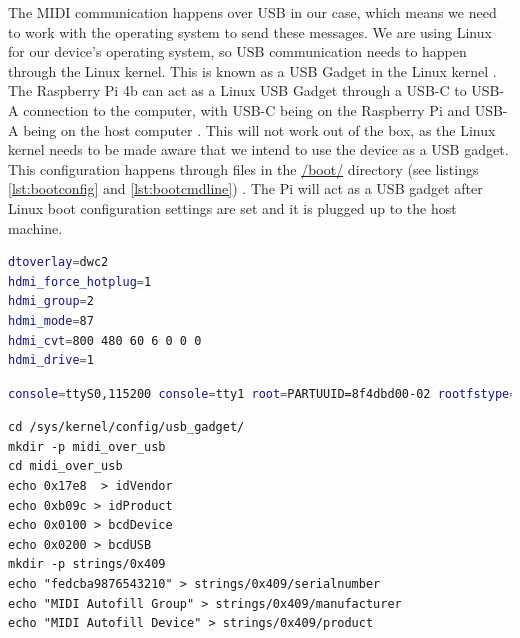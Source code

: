 The MIDI communication happens over USB in our case, which means we need to work with the
operating system to send these messages. We are using Linux for our device's operating
system, so USB communication needs to happen through the Linux kernel. This is known as a
USB Gadget in the Linux kernel \autocite{usbGadgetDocumentation}. The Raspberry Pi 4b can
act as a Linux USB Gadget through a USB-C to USB-A connection to the computer, with USB-C
being on the Raspberry Pi and USB-A being on the host computer
\autocite{raspberryPiGadgetSetup}. This will not work out of the box, as the Linux kernel
needs to be made aware that we intend to use the device as a USB gadget. This
configuration happens through files in the \url{/boot/} directory
(see listings \ref{lst:bootconfig} and
\ref{lst:bootcmdline}) \autocite{raspberryPiGadgetSetup}. The Pi will act as a USB
gadget after Linux boot configuration settings are set and it is plugged up to the host
machine.

\begin{minipage}{\linewidth}

  \begin{lstlisting}[language=bash,
  label={lst:bootconfig},
  caption=Lines added to /boot/config.txt \autocite{raspberryPiGadgetSetup, raspberryPiHDMIFix}]
dtoverlay=dwc2
hdmi_force_hotplug=1
hdmi_group=2
hdmi_mode=87
hdmi_cvt=800 480 60 6 0 0 0
hdmi_drive=1
  \end{lstlisting}

  \begin{lstlisting}[language=bash, label={lst:bootcmdline}, caption=DietPi /boot/cmdline.txt modified to allow a USB Gadget \autocite{raspberryPiGadgetSetup}, breaklines=true]
console=ttyS0,115200 console=tty1 root=PARTUUID=8f4dbd00-02 rootfstype=ext4 elevator=deadline fsck.repair=yes rootwait quiet net.ifnames=0 modules-load=dwc2,g_ether
  \end{lstlisting}

  \begin{lstlisting}[label={lst:usb_gadget}, caption=Bash procedure to setup a MIDI Gadget\, modified for our device \autocite{raspberryPiGadgetSetup}, breaklines=true]
cd /sys/kernel/config/usb_gadget/
mkdir -p midi_over_usb
cd midi_over_usb
echo 0x17e8  > idVendor
echo 0xb09c > idProduct
echo 0x0100 > bcdDevice
echo 0x0200 > bcdUSB
mkdir -p strings/0x409
echo "fedcba9876543210" > strings/0x409/serialnumber
echo "MIDI Autofill Group" > strings/0x409/manufacturer
echo "MIDI Autofill Device" > strings/0x409/product
  \end{lstlisting}

\end{minipage}

